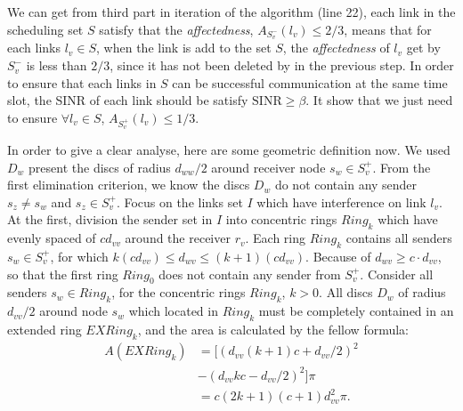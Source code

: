 \documentclass[conference]{IEEEtran}
\begin{document}
We can get from third part in iteration of the algorithm (line 22), each link in the scheduling set $S$ satisfy that the \emph{affectedness}, $A_{S^-_v}(l_v) \leq 2/3$, means that for each links $l_v \in S$, when the link is add to the set $S$, the \emph{affectedness} of $l_v$ get by $S^-_v$ is less than $2/3$, since it has not been deleted by in the previous step. In order to ensure that each links in $S$ can be successful communication at the same time slot, the SINR of each link should be satisfy $\textrm{SINR} \geq \beta$. It show that we just need to ensure $\forall l_v \in S $, $ A_{S^+_v}(l_v) \leq 1/3$.

In order to give a clear analyse, here are some geometric definition now. We used $D_w$ present the discs of radius $d_{ww}/2$ around receiver node $s_w \in S^+_v$. From the first elimination criterion, we know the discs $D_w$ do not contain any sender $s_z \neq s_w$ and $s_z \in S^+_v$. Focus on the links set $I$ which have interference on link $l_v$. At the first, division the sender set in $I$ into concentric rings $Ring_k$ which have evenly spaced of $cd_{vv}$ around the receiver $r_v$. Each ring $Ring_k$ contains all senders $s_w \in S^+_v$, for which $k(cd_{vv}) \leq d_{wv} \leq (k+1)(c d_{vv})$. Because of $d_{wv} \geq c \cdot d_{vv}$, so that the first ring $Ring_0$ does not contain any sender from $S^+_v$. Consider all senders $s_w \in Ring_k$, for the concentric rings $Ring_k$, $k>0$. All discs $D_w$ of radius $d_{vv}/2$ around node $s_w$ which located in $Ring_k$ must be completely contained in an extended ring $EXRing_k$, and the area is calculated by the fellow formula:
\begin{equation*}
\begin{split}
A(EXRing_k)&=[(d_{vv}(k+1)c+ d_{vv}/2)^2\\
&   - (d_{vv}kc - d_{vv}/2)^2]\pi  \\
&=c(2k+1) (c+1) d^2_{vv}\pi.
\end{split}
\end{equation*}
\end{document}
